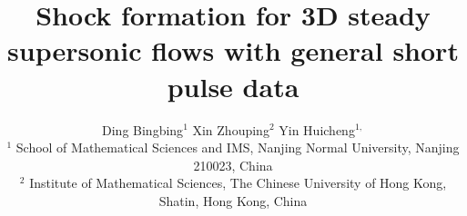 \documentclass[11pt,twoside]{article}
\begin{document}
\footskip=0pt
\footnotesep=2pt
\let\oldsection\section
\renewcommand\section{\setcounter{equation}{0}\oldsection}
\renewcommand\thesection{\arabic{section}}
\renewcommand\theequation{\thesection.\arabic{equation}}
\newtheorem{claim}{\noindent Claim}[section]
\newtheorem{theorem}{\noindent Theorem}[section]
\newtheorem{lemma}{\noindent Lemma}[section]
\newtheorem{proposition}{\noindent Proposition}[section]
\newtheorem{definition}{\noindent Definition}[section]
\newtheorem{remark}{\noindent Remark}[section]
\newtheorem{corollary}{\noindent Corollary}[section]
\newtheorem{example}{\noindent Example}[section]
\newcommand{\address}[1]{%
  \begingroup
  \centering
  \small
  #1\\
  \endgroup
  \vspace{0.2cm}
}
\title{Shock formation for 3D steady supersonic flows with general short pulse data}


\author{
Ding Bingbing$^{1}$ \quad Xin Zhouping$^{2}$ \quad Yin Huicheng$^{1,}$
\footnotemark[1]
\\[0.5cm]
\small
$^{1}$ School of Mathematical Sciences and IMS, Nanjing Normal University, Nanjing 210023, China\\
\small
$^{2}$ Institute of Mathematical Sciences, The Chinese University of Hong Kong, Shatin, Hong Kong, China
}


\date{}
\maketitle
\end{document}
